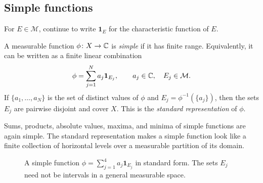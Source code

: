 \subsection{Simple functions}

For $E\in\mathcal M$, continue to write $\mathbf 1_E$ for the
characteristic function of $E$.

\begin{definition}
  A measurable function $\phi\colon X\to\mathbb{C}$ is \emph{simple} if it
  has finite range.  Equivalently, it can be written as a finite linear
  combination
  \[
    \phi=\sum_{j=1}^{N}a_j\mathbf 1_{E_j},
    \qquad a_j\in\mathbb{C},\quad E_j\in\mathcal M.
  \]
  If $\{a_1,\ldots,a_N\}$ is the set of distinct values of $\phi$ and
  $E_j=\phi^{-1}(\{a_j\})$, then the sets $E_j$ are pairwise disjoint
  and cover $X$.  This is the \emph{standard representation} of
  $\phi$.
\end{definition}

Sums, products, absolute values, maxima, and minima of simple functions
are again simple.  The standard representation makes a simple function
look like a finite collection of horizontal levels over a measurable
partition of its domain.

\begin{figure}[htbp]
  \centering
  \caption{A simple function
    $\phi=\sum_{j=1}^{4}a_j\mathbf 1_{E_j}$ in standard form.  The
    sets $E_j$ need not be intervals in a general measurable space.}
  \label{fig:simple-function-sep-17}
\end{figure}

